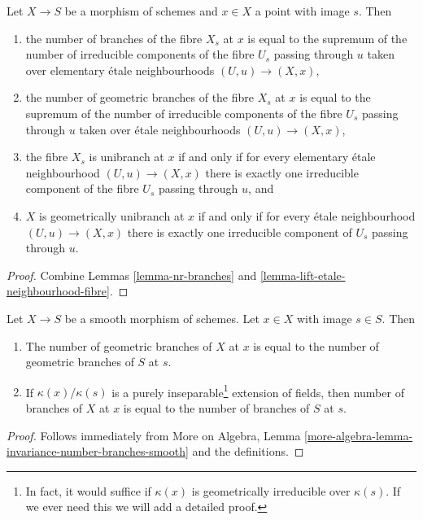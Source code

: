 \begin{lemma}
\label{lemma-nr-branches-fibre}
Let $X \to S$ be a morphism of schemes and $x \in X$ a point with image $s$.
Then
\begin{enumerate}
\item the number of branches of the fibre $X_s$ at $x$ is equal to
the supremum of the number of irreducible components of the fibre $U_s$
passing through $u$ taken over elementary \'etale neighbourhoods
$(U, u) \to (X, x)$,
\item the number of geometric branches of the fibre $X_s$ at $x$ is equal to
the supremum of the number of irreducible components of the fibre $U_s$
passing through $u$ taken over \'etale neighbourhoods
$(U, u) \to (X, x)$,
\item the fibre $X_s$ is unibranch at $x$ if and only if for every
elementary \'etale neighbourhood $(U, u) \to (X, x)$ there is
exactly one irreducible component of the fibre $U_s$ passing through $u$, and
\item $X$ is geometrically unibranch at $x$ if and only if for every
\'etale neighbourhood $(U, u) \to (X, x)$ there
is exactly one irreducible component of $U_s$ passing through $u$.
\end{enumerate}
\end{lemma}

\begin{proof}
Combine Lemmas \ref{lemma-nr-branches} and
\ref{lemma-lift-etale-neighbourhood-fibre}.
\end{proof}

\begin{lemma}
\label{lemma-number-of-branches-and-smooth}
Let $X \to S$ be a smooth morphism of schemes.
Let $x \in X$ with image $s \in S$.
Then
\begin{enumerate}
\item The number of geometric branches of $X$ at $x$
is equal to the number of geometric branches of $S$ at $s$.
\item If $\kappa(x)/\kappa(s)$ is a purely inseparable\footnote{In fact,
it would suffice if $\kappa(x)$ is geometrically irreducible over
$\kappa(s)$. If we ever need this we will add a detailed proof.}
extension of fields, then number of branches of $X$ at $x$
is equal to the number of branches of $S$ at $s$.
\end{enumerate}
\end{lemma}

\begin{proof}
Follows immediately from More on Algebra, Lemma
\ref{more-algebra-lemma-invariance-number-branches-smooth}
and the definitions.
\end{proof}





